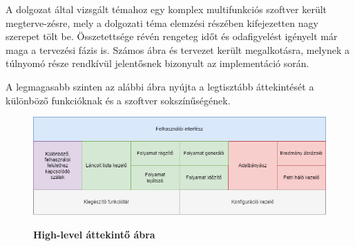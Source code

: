 

A dolgozat által vizsgált témahoz egy komplex multifunkciós szoftver került megterve\hyp{}zésre, mely a dolgozati téma elemzési részében kifejezetten nagy szerepet tölt be. Összetettsége révén rengeteg időt és odafigyelést igényelt már maga a tervezési fázis is. Számos ábra és tervezet került megalkotásra, melynek a túlnyomó része rendkívül jelentősnek bizonyult az implementáció során.

A legmagasabb szinten az alábbi ábra nyújta a legtisztább áttekintését a különböző funkcióknak és a szoftver sokszínűségének.

\begin{figure}[h!]
\begin{center}
\caption{\textbf{High-level áttekintő ábra}}
\includegraphics[width=\textwidth,keepaspectratio=true]{images/img_plan_1}
\label{fig:plan}
\end{center}
\end{figure}

